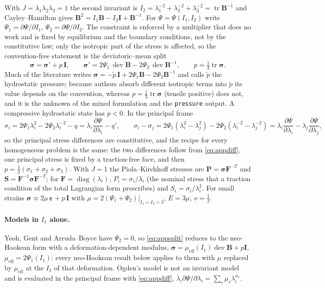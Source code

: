 \documentclass[11pt]{article}
\newcommand{\beps}{\bm{\varepsilon}}
\newcommand{\dev}{\operatorname{dev}}
\newcommand{\tr}{\operatorname{tr}}
\newcommand{\diag}{\operatorname{diag}}
\newcommand{\bsig}{\bm{\sigma}}
\newcommand{\bP}{\bm{P}}
\newcommand{\bF}{\bm{F}}
\newcommand{\bB}{\bm{B}}
\newcommand{\bI}{\bm{I}}
\newcommand{\bS}{\bm{S}}
\newcommand{\Pone}{\Psi_{1}}
\newcommand{\Ptwo}{\Psi_{2}}
\newcommand{\Ione}{I_1}
\newcommand{\Itwo}{I_2}
\DeclareRobustCommand{\code}[1]{{\def\_{\textunderscore\allowbreak}\texttt{#1}}}
\begin{document}
With $J = \lambda_1\lambda_2\lambda_3 = 1$ the second invariant is
$\Itwo = \lambda_1^{-2} + \lambda_2^{-2} + \lambda_3^{-2} = \tr\bB^{-1}$ and
Cayley--Hamilton gives $\bB^2 = \Ione\bB - \Itwo\bI + \bB^{-1}$.  For
$\Psi = \Psi(\Ione, \Itwo)$ write $\Pone = \partial\Psi/\partial\Ione$,
$\Ptwo = \partial\Psi/\partial\Itwo$.  The constraint is enforced by a
multiplier that does no work and is fixed by equilibrium and the boundary
conditions, not by the constitutive law; only the isotropic part of the
stress is affected, so the convention-free statement is the
deviatoric--mean split
\begin{equation}
  \boxed{\;
  \bsig = \bsig' + p\,\bI, \qquad
  \bsig' = 2\Pone\,\dev\bB - 2\Ptwo\,\dev\bB^{-1}, \qquad
  p = \tfrac13\tr\bsig .\;}
  \label{eq:appsplit}
\end{equation}
Much of the literature writes
$\bsig = -\tilde p\,\bI + 2\Pone\bB - 2\Ptwo\bB^{-1}$ and calls $\tilde p$
the hydrostatic pressure; because authors absorb different isotropic terms
into $\tilde p$ its value depends on the convention, whereas
$p = \tfrac13\tr\bsig$ (tensile positive) does not, and it is the unknown
of the mixed formulation and the \code{pressure} output.  A compressive
hydrostatic state has $p < 0$.  In the principal frame
\begin{equation}
  \sigma_i = 2\Pone\lambda_i^2 - 2\Ptwo\lambda_i^{-2} - q
           = \lambda_i\frac{\partial\Psi}{\partial\lambda_i} - q', \qquad
  \sigma_i - \sigma_j
  = 2\Pone(\lambda_i^2 - \lambda_j^2) - 2\Ptwo(\lambda_i^{-2} - \lambda_j^{-2})
  = \lambda_i\frac{\partial\Psi}{\partial\lambda_i}
  - \lambda_j\frac{\partial\Psi}{\partial\lambda_j},
  \label{eq:appdiff}
\end{equation}
so the principal stress differences are constitutive, and the recipe for
every homogeneous problem is the same: the two differences follow from
\eqref{eq:appdiff}, one principal stress is fixed by a traction-free face,
and then $p = \tfrac13(\sigma_1 + \sigma_2 + \sigma_3)$.  With $J = 1$ the
Piola--Kirchhoff stresses are $\bP = \bsig\bF^{-T}$ and
$\bS = \bF^{-1}\bsig\bF^{-T}$; for $\bF = \diag(\lambda_i)$,
$P_i = \sigma_i/\lambda_i$ (the nominal stress that a traction condition
of the total Lagrangian form prescribes) and $S_i = \sigma_i/\lambda_i^2$.
For small strains $\bsig \approx 2\mu\,\beps + p\,\bI$ with
$\mu = 2(\Pone + \Ptwo)|_{\Ione = \Itwo = 3}$, $E = 3\mu$, $\nu = \tfrac12$.

\paragraph{Models in $\Ione$ alone.}
Yeoh, Gent and Arruda--Boyce have $\Ptwo = 0$, so \eqref{eq:appsplit}
reduces to the neo-Hookean form with a deformation-dependent modulus,
$\bsig = \mu_{\mathrm{eff}}(\Ione)\dev\bB + p\bI$,
$\mu_{\mathrm{eff}} = 2\Pone(\Ione)$: every neo-Hookean result below
applies to them with $\mu$ replaced by $\mu_{\mathrm{eff}}$ at the $\Ione$ of
that deformation.  Ogden's model is not an invariant model and is
evaluated in the principal frame with \eqref{eq:appdiff},
$\lambda_i\partial\Psi/\partial\lambda_i = \sum_r\mu_r\lambda_i^{\alpha_r}$.
\end{document}
